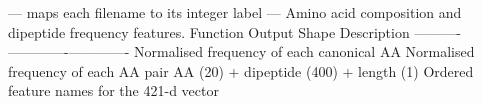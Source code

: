 {}\markdownRendererInterblockSeparator
{}\markdownRendererUlBeginTight
\markdownRendererUlItem {}\markdownRendererUlItemEnd 
\markdownRendererUlItem {} — maps each filename to its integer label\markdownRendererUlItemEnd 
\markdownRendererUlItem {} — \markdownRendererUlItemEnd 
\markdownRendererUlEndTight \markdownRendererInterblockSeparator
{}\markdownRendererThematicBreak{}\markdownRendererInterblockSeparator
{}
\markdownRendererSectionEnd \markdownRendererSectionBegin
{}\markdownRendererInterblockSeparator
{} Amino acid composition and dipeptide frequency features.\markdownRendererParagraphSeparator
{}\markdownRendererPipe{} Function \markdownRendererPipe{} Output Shape \markdownRendererPipe{} Description \markdownRendererPipe{}\markdownRendererSoftLineBreak
{}\markdownRendererPipe{}----------\markdownRendererPipe{}-------------\markdownRendererPipe{}-------------\markdownRendererPipe{}\markdownRendererSoftLineBreak
{}\markdownRendererPipe{}  \markdownRendererPipe{}  \markdownRendererPipe{} Normalised frequency of each canonical AA \markdownRendererPipe{}\markdownRendererSoftLineBreak
{}\markdownRendererPipe{}  \markdownRendererPipe{}  \markdownRendererPipe{} Normalised frequency of each AA pair \markdownRendererPipe{}\markdownRendererSoftLineBreak
{}\markdownRendererPipe{}  \markdownRendererPipe{}  \markdownRendererPipe{} AA (20) + dipeptide (400) + length (1) \markdownRendererPipe{}\markdownRendererSoftLineBreak
{}\markdownRendererPipe{}  \markdownRendererPipe{}  \markdownRendererPipe{} Ordered feature names for the 421-d vector \markdownRendererPipe{}\markdownRendererInterblockSeparator
